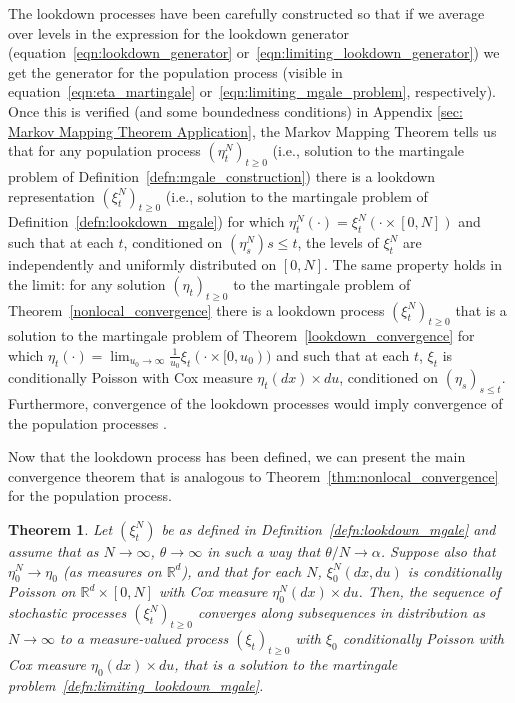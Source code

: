 \documentclass[12pt]{article}
\newtheorem{theorem}{Theorem}[section]
\newcommand{\IR}{\mathbb R}
\newcommand{\lp}{\xi}              %
\begin{document}
The lookdown processes have been carefully constructed so that
if we average over levels in the expression for the lookdown generator
(equation~\eqref{eqn:lookdown_generator} or~\eqref{eqn:limiting_lookdown_generator})
we get the generator for the population process
(visible in equation~\eqref{eqn:eta_martingale}
or~\eqref{eqn:limiting_mgale_problem}, respectively).
Once this is verified (and some boundedness conditions)
in Appendix \ref{sec: Markov Mapping Theorem Application},
the Markov Mapping Theorem \citep[Thm A.2 in][]{etheridge/kurtz:2018}
tells us that for any population process $(\eta^N_t)_{t \ge 0}$
(i.e., solution to the martingale problem of Definition~\ref{defn:mgale_construction})
there is a lookdown representation $(\lp^N_t)_{t \ge 0}$
(i.e., solution to the martingale problem of Definition~\ref{defn:lookdown_mgale})
for which $\eta^N_t(\cdot) = \lp^N_t(\cdot \times [0, N])$
and such that at each $t$, conditioned on $(\eta^N_s){s \le t}$, the levels of $\lp_t^N$
are independently and uniformly distributed on $[0, N]$.
The same property holds in the limit:
for any solution $(\eta_t)_{t \ge 0}$ to the martingale problem of Theorem~\ref{nonlocal_convergence}
there is a lookdown process $(\lp^N_t)_{t \ge 0}$
that is a solution to the martingale problem of Theorem~\ref{lookdown_convergence}
for which $\eta_t(\cdot) = \lim_{u_0 \to \infty} \frac{1}{u_0} \lp_t(\cdot \times [0, u_0))$
and such that at each $t$,
$\lp_t$ is conditionally Poisson with Cox measure $\eta_t(dx) \times du$,
conditioned on $(\eta_s)_{s \le t}$.
Furthermore, convergence of the lookdown processes would imply convergence of the population processes
\citep[Thm A.9 in][]{KR}.

Now that the lookdown process has been defined,
we can present the main convergence theorem that is analogous
to Theorem~\ref{thm:nonlocal_convergence} for the population process.


\begin{theorem}
    \label{thm:lookdown_convergence}
    Let $(\lp_t^N)$ be as defined in Definition~\ref{defn:lookdown_mgale}
    and assume that as $N \to \infty$,
    $\theta \to \infty$ in such a way that $\theta/N \to \alpha$.
    Suppose also that $\eta^N_0 \to \eta_0$ (as measures on $\IR^d$),
    and that for each $N$, $\lp^N_0(dx, du)$ is conditionally Poisson on $\IR^d \times [0, N]$
    with Cox measure $\eta^N_0(dx) \times du$.
    Then, the sequence of stochastic processes $(\lp_t^N)_{t \ge 0}$
    converges along subsequences in distribution as $N \to \infty$
    to a measure-valued process $(\lp_t)_{t \ge 0}$
    with $\lp_0$ conditionally Poisson with Cox measure $\eta_0(dx) \times du$,
    that is a solution to the martingale problem~\ref{defn:limiting_lookdown_mgale}.
\end{theorem}
\end{document}
